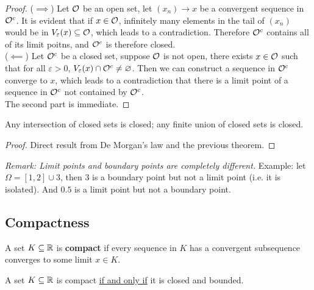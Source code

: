\documentclass[11pt]{article}
\begin{document}
	\begin{proof}
		($\implies$) Let $\mathcal{{O}}$ be an open set, let $(x_n) \to x$ be a convergent sequence in $\mathcal{{O}}^c$. It is evident that if $x \in \mathcal{{O}}$, infinitely many elements in the tail of $(x_n)$ would be in $V_\varepsilon(x) \subseteq \mathcal{{O}}$, which leads to a contradiction. Therefore $\mathcal{{O}}^c$ contains all of its limit poitns, and $\mathcal{{O}}^c$ is therefore closed.
		\\($\impliedby$) Let $\mathcal{{O}}^c$ be a closed set, suppose $\mathcal{{O}}$ is not open, there exists $x \in \mathcal{{O}}$ such that for all $\varepsilon > 0$, $V_\varepsilon(x) \cap \mathcal{{O}}^c \neq \varnothing$. Then we can construct a sequence in $\mathcal{{O}}^c$ converge to $x$, which leads to a contradiction that there is a limit point of a sequence in $\mathcal{{O}}^c$ not contained by $\mathcal{{O}}^c$. \\
		The second part is immediate.
	\end{proof}
	
	\begin{theorem}
		Any intersection of closed sets is closed; any finite union of closed  sets is closed.
	\end{theorem}
	
	\begin{proof}
		Direct result from De Morgan's law and the previous theorem.
	\end{proof}
	
	\emph{Remark: Limit points and boundary points are completely different.} Example: let $\Omega = [1, 2] \cup {3}$, then $3$ is a boundary point but not a limit point (i.e. it is isolated). And $0.5$ is a limit point but not a boundary point.
	
	\subsection{Compactness}
	\begin{definition}
		A set $K \subseteq \mathbb{R}$ is \textbf{compact} if every sequence in $K$ has a convergent subsequence converges to some limit $x \in K$.
	\end{definition}
	
	\begin{theorem}
		A set $K \subseteq \mathbb{R}$ is compact \ul{if and only if} it is closed and bounded.
	\end{theorem}
	
\end{document}
